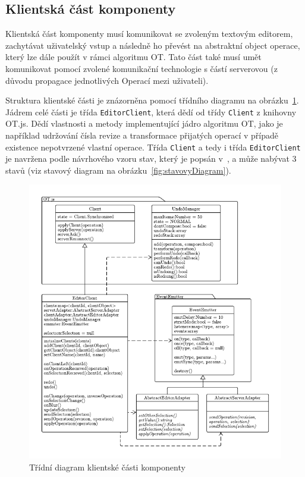 

\subsection{Klientská část komponenty}\label{subsec:klientskáČást}

Klientská část komponenty musí komunikovat se zvoleným textovým editorem, zachytávat uživatelský vstup a následně ho převést na abstraktní object operace, který lze dále použít v rámci algoritmu \gls{OT}.
Tato část také musí umět komunikovat pomocí zvolené komunikační technologie s částí serverovou (z důvodu propagace jednotlivých Operací mezi uživateli).

Struktura klientské části je znázorněna pomocí třídního diagramu na obrázku~\ref{fig:EditorClient}.
Jádrem celé části je třída \texttt{EditorClient}, která dědí od třídy \texttt{Client} z knihovny OT.js.
Dědí vlastnosti a metody implementující jádro algoritmu \gls{OT}, jako je například udržování čísla revize a transformace přijatých operací v případě existence nepotvrzené vlastní operace.
Třída \texttt{Client} a tedy i třída \texttt{EditorClient} je navržena podle návrhového vzoru stav, který je popsán v~\cite[str.~283]{gof:patterns}, a může nabývat 3 stavů (viz stavový diagram na obrázku~\ref{fig:stavovyDiagram}).

\begin{figure}[ht!]
    \centering
    \includegraphics[width=\textwidth]{partials/navrh/editor/EditorClient.pdf}
    \caption{Třídní diagram klientské části komponenty}\label{fig:EditorClient}
\end{figure}

